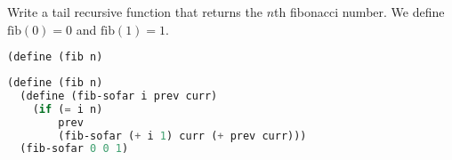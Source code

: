\question
Write a tail recursive function that returns the $n$th fibonacci number. We
define $\text{fib}(0) = 0$ and $\text{fib}(1) = 1$.

\begin{lstlisting}[language=Scheme]
(define (fib n)
\end{lstlisting}
\begin{solution}[1.5in]
\begin{lstlisting}[language=Scheme]
(define (fib n)
  (define (fib-sofar i prev curr)
    (if (= i n)
        prev
        (fib-sofar (+ i 1) curr (+ prev curr)))
  (fib-sofar 0 0 1)
\end{lstlisting}
\end{solution}
